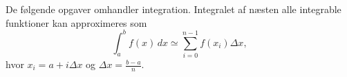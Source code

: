 De følgende opgaver omhandler integration. Integralet af næsten alle integrable funktioner kan approximeres som $$\int_a^bf(x)\,dx\simeq\sum_{i=0}^{n-1}f(x_i)\Delta x,$$ hvor $x_i = a + i\Delta x$ og $\Delta x = \frac{b-a}{n}$.
